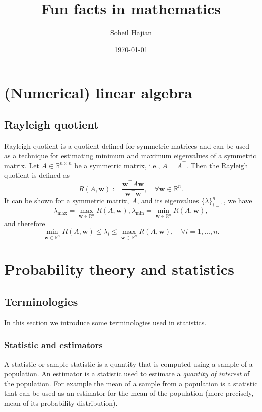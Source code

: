 \documentclass[11pt]{article}
\title{Fun facts in mathematics} \author{Soheil Hajian} \date{\today}
\newcommand{\w}{\textbf{w}}
\newcommand{\R}{\mathbb{R}}
\begin{document}
\maketitle
\tableofcontents
\pagebreak

\section{(Numerical) linear algebra}
\subsection{Rayleigh quotient} \label{sec:rayleigh}
Rayleigh quotient is a quotient defined for symmetric matrices and can
be used as a technique for estimating minimum and maximum eigenvalues
of a symmetric matrix. Let $A \in \R^{n\times n}$ be a symmetric
matrix, i.e., $A=A^\top$. Then the Rayleigh quotient is defined as
\begin{equation}
  R(A, \w) := \frac{\w^\top A \w}{\w^\top \w}, \quad \forall \w \in \R^{n}.
\end{equation}
It can be shown for a symmetric matrix, $A$, and
its eigenvalues $\{\lambda\}_{i=1}^{n}$, we have
\begin{equation}
  \lambda_{\max} = \max_{\w \in \R^n} R(A, \w),
  \lambda_{\min} = \min_{\w \in \R^n} R(A, \w),
\end{equation}
and therefore
\begin{equation}
  \min_{\w \in \R^n} R(A, \w) \leq \lambda_i \leq \max_{\w \in \R^n}
  R(A, \w), \quad \forall i = 1, \dots, n.
\end{equation}
\section{Probability theory and statistics}
\subsection{Terminologies}
In this section we introduce some terminologies used in statistics.
\subsubsection{\color{red}Statistic and estimators}
A statistic or sample statistic is a quantity that is computed using a
sample of a population. An estimator is a statistic used to estimate a
{\it quantity of interest} of the population. For example the mean of a
sample from a population is a statistic that can be used as an
estimator for the mean of the population (more precisely, mean of its
probability distribution).
\end{document}
